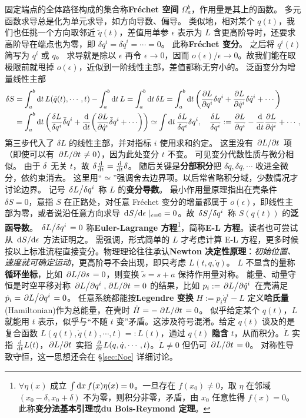 固定端点的全体路径构成的集合称\textbf{Fréchet 空间} $\Omega_a^b$，作用量是其上的函数。
多元函数求导总是化为单元求导，如方向导数、偏导。
类似地，相对某个 $q(t)$，我们也任挑一个方向取邻近 $\tilde q(t)$，差值用单参 $\epsilon$ 表示为
$L$ 含更高阶导时，还要求高阶导在端点也为零，即 $\delta q^i=\delta\dot q^i=\cdots=0$。
此称\textbf{Fréchet 变分}。
之后将 $q^i(t)$ 简写为 $q^i$ 或 $q$。
求导就是除以 $\epsilon$ 再令 $\epsilon\to 0$，因而 $o(\epsilon)/\epsilon\to 0$。故我们能在取极限前就甩掉 $o(\epsilon)$，近似到一阶线性主部，差值都称无穷小的。
泛函变分为增量线性主部
\begin{align*}
    \var S&=\int_{a}^{b}\d{t} L(\tilde q(t),\cdots,t) - \int_a^b\d{t} L=\int_a^b\d{t} \delta L=\int_a^b\d t \left(\pdv{L}{q^i}\delta q^i+\pdv{L}{\dot q^i}\delta \dot q^i + \cdots\right)\\
    &=\int_a^b\d t \left(\fdv{L}{q^i}\bar\delta q^i + \dv{t}(\pdv{L}{\dot q^i}\bar\delta q^i +\cdots )\right) \simeq \int\d{t} \fdv{L}{q^i} \delta q^i,\quad \fdv{L}{q^i} := \pdv{L}{q^i}-\dv{t}\pdv{L}{\dot q^i} + \cdots,
\end{align*}
第三步代入了 $\delta L$ 的线性主部，并对指标 $i$ 使用求和约定。
这里没有 $\pdv*{L}{t}$ 项（即使可以有 $\pdv*{L}{t}\ne 0$），因为此处变分 $t$ 不变。
可见变分代数性质与微分相似。
由于 $\var$ 无关 $t$，故 $\var\dv{t} =\dv{t}\var$。
随后关键是\textbf{分部积分}把 $\delta\dot q,\delta\ddot q,\cdots$ 收进全微分，依约束消去。
这里用“$\simeq$”强调舍去边界项。以后常省略积分域，少数情况才讨论边界。
记号 $\fdv*{L}{q^i}$ 称 $L$ 的\textbf{变分导数}。
最小作用量原理指出在壳条件 $\delta S=0$，意指 $S$ 在正路处，对任意 Fréchet 变分的增量都属于 $o(\epsilon)$，即线性主部为零，或者说沿任意方向求导 $\dv*{S}{\epsilon}|_{\epsilon=0}=0$。故
$\fdv*{S}{q^i}$ 称 $S(q(t))$ 的\textbf{泛函导数}。
$\fdv*{L}{q^i} = 0$ 称\textbf{Euler-Lagrange 方程}\footnote{$\forall\eta(x)$ 成立 $\int\dd{x} f(x)\eta(x)=0$。一旦存在 $f(x_0)\ne 0$，取 $\eta$ 在邻域 $(x_0-\delta,x_0+\delta)$ 不为零，则积分非零，矛盾，由 $x_0$ 任意性得 $f(x)=0$。此称\textbf{变分法基本引理}或\textbf{du Bois-Reymond 定理}。}，简称\textbf{E-L 方程}。读者也可尝试从 $\dv*{S}{\epsilon}$ 方法证明之。
需强调，形式简单的 $L$ 才考虑计算 E-L 方程，更多时候按以上标准流程直接变分。物理理论往往承认\textbf{Newton 决定性原理}：\emph{初始位置、速度就可确定运动}，更高阶导不会出现，即只考虑 $L(t,q,\dot q)$。
$L$ 不显含的量称\textbf{循环坐标}，比如 $\pdv*{L}{s}=0$，则变换 $\tilde s=s+a$ 保持作用量对称。
能量、动量守恒是时空平移对称 $\pdv*{L}{q^i},\pdv*{L}{t}=0$ 的结果，比如 $p_i:=\pdv*{L}{\dot q^i}$ 在壳满足 $\dot p_i=\pdv*{L}{q^i}=0$。
任意系统都能按\textbf{Legendre 变换} $H:=p_i\dot q^i-L$ 定义\textbf{哈氏量}(Hamiltonian)作为总能量，在壳时 $\dot H=-\pdv*{L}{t}=0$。
似乎给定某个 $q(t)$，$L$ 就能用 $t$ 表示，似乎与“不随 $t$ 变”矛盾。这涉及符号混淆。给定 $q(t)$ 谈及的是复合函数 $L(q(t),\dot q(t),\cdots,t) =: L(t)$，通过 $q(t)$ \textbf{隐含} $t$，从而积分。$\dot L$ 实指 $\dv{t}L(t)$，$\pdv*{L}{t}$ 实指 $\pdv{t}L(q,\dot q,\cdots,t)$。$\dot L\ne 0$ 但仍可 $\pdv*{L}{t}=0$。
对称性导致守恒，这一思想还会在 \S\ref{sec:Noe} 详细讨论。

